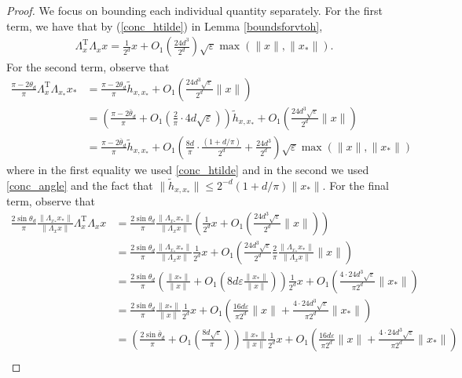 \documentclass[11pt]{article}
\renewcommand{\epsilon}{\varepsilon}
\renewcommand{\top}{{\mathrm{T}}}
\theoremstyle{remark}
\begin{document}
\begin{proof}
We focus on bounding each individual quantity separately. For the first term, we have that by (\ref{conc_htilde}) in Lemma \ref{boundsforvtoh}, \begin{align}
\Lambda_x^\top\Lambda_x x  = \frac{1}{2^d}x + O_1 \left(  \frac{24d^3 }{2^d}\right)\sqrt{\epsilon}\max(\|x\|,\|x_*\|). \label{wx_lemma_t1}
\end{align} For the second term, observe that \begin{align}
    \frac{\pi - 2\theta_d}{\pi}\Lambda_x^\top\Lambda_{x_*}x_* & = \frac{\pi - 2\theta_d}{\pi}\tilde{h}_{x,x_*} + O_1\left(  \frac{24d^3 \sqrt{\epsilon}}{2^d}\|x\|\right) \nonumber \\
    & = \left(\frac{\pi - 2\overline{\theta}_d}{\pi} + O_1\left(\frac{2}{\pi}\cdot 4d\sqrt{\epsilon}\right)\right)\tilde{h}_{x,x_*} + O_1\left(  \frac{24d^3 \sqrt{\epsilon}}{2^d}\|x\|\right) \nonumber \\
    & = \frac{\pi - 2\overline{\theta}_d}{\pi}\tilde{h}_{x,x_*} + O_1\left(\frac{8d}{\pi}\cdot\frac{(1 + d/\pi)}{2^d} + \frac{24d^3}{2^d}\right)\sqrt{\epsilon}\max(\|x\|,\|x_*\|) \label{wx_lemma_t2}
\end{align}where in the first equality we used \eqref{conc_htilde} and in the second we used \eqref{conc_angle} and the fact that $\|\tilde{h}_{x,x_*}\|\leqslant 2^{-d}(1+d/\pi)\|x_*\|.$ For the final term, observe that \begin{align}
    \frac{2\sin \theta_d}{\pi}\frac{\|\Lambda_{x_*}x_*\|}{\|\Lambda_x x\|}\Lambda_x^\top\Lambda_x x & = \frac{2\sin \theta_d}{\pi} \frac{\|\Lambda_{x_*}x_*\|}{\|\Lambda_x x\|}\left(\frac{1}{2^d}x + O_1\left(\frac{24d^3\sqrt{\epsilon}}{2^d}\|x\|\right)\right) \nonumber\\
    & = \frac{2\sin \theta_d}{\pi}\frac{\|\Lambda_{x_*}x_*\|}{\|\Lambda_x x\|}\frac{1}{2^d}x + O_1\left(\frac{24d^3\sqrt{\epsilon}}{2^d}\frac{2}{\pi}\frac{\|\Lambda_{x_*}x_*\|}{\|\Lambda_x x\|}\|x\|\right) \nonumber\\
    & = \frac{2\sin \theta_d}{\pi}\left(\frac{\|x_*\|}{\|x\|} + O_1\left(8d\epsilon\frac{\|x_*\|}{\|x\|}\right)\right)\frac{1}{2^d}x + O_1\left(\frac{4\cdot 24d^3\sqrt{\epsilon}}{\pi2^d}\|x_*\|\right)\nonumber \\
    & = \frac{2\sin \theta_d}{\pi}\frac{\|x_*\|}{\|x\|}\frac{1}{2^d}x + O_1\left(\frac{16d\epsilon}{\pi 2^d}\|x\| + \frac{4\cdot 24 d^3\sqrt{\epsilon}}{\pi 2^d}\|x_*\|\right) \nonumber\\
    & = \left(\frac{2\sin \overline{\theta}_d}{\pi} + O_1\left(\frac{8d\sqrt{\epsilon}}{\pi}\right)\right)\frac{\|x_*\|}{\|x\|}\frac{1}{2^d}x + O_1\left(\frac{16d\epsilon}{\pi 2^d}\|x\| + \frac{4\cdot 24 d^3\sqrt{\epsilon}}{\pi 2^d}\|x_*\|\right) \nonumber\\

\end{align}
\end{proof}
\end{document}
